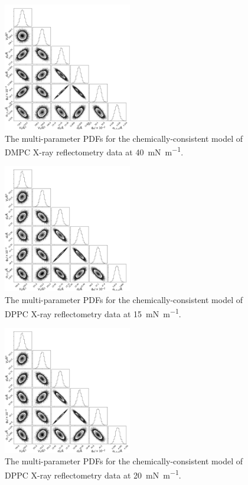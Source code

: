\documentclass[amsmath,amssymb,superscriptaddress]{revtex4-1}
\begin{document}
\begin{figure}[H]
	\centering
	\includegraphics[width=0.50\textwidth]{figures/dmpc4_all_corner}
	\caption{The multi-parameter PDFs for the chemically-consistent model of DMPC X-ray reflectometry data at \SI{40}{\milli\newton\per\meter}.}
	\label{fig:dmpc4}
\end{figure}
\begin{figure}[H]
	\centering
	\includegraphics[width=0.50\textwidth]{figures/dppc1_all_corner}
	\caption{The multi-parameter PDFs for the chemically-consistent model of DPPC X-ray reflectometry data at \SI{15}{\milli\newton\per\meter}.}
	\label{fig:dppc1}
\end{figure}
\begin{figure}[H]
	\centering
	\includegraphics[width=0.50\textwidth]{figures/dppc2_all_corner}
	\caption{The multi-parameter PDFs for the chemically-consistent model of DPPC X-ray reflectometry data at \SI{20}{\milli\newton\per\meter}.}
	\label{fig:dppc2}
\end{figure}
\end{document}
